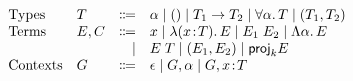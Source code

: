 \[
\begin{array}{llrl}
  \text{Types}    & T    & \Coloneqq & \alpha \mid () \mid {T_1} \to {T_2} \mid \forall \alpha.\, T \mid (T_1, T_2) \\
  \text{Terms}    & E, C & \Coloneqq & x \mid \lambda (x \!:\! T).\, E \mid E_1 \; E_2 \mid \Lambda \alpha.\, E \\
                  &      & \mid      & E \; T \mid (E_1, E_2) \mid {\textsf{proj}}_{k} E \\
  \text{Contexts} & G    & \Coloneqq & \epsilon \mid G, \alpha \mid G, x \!:\! T \\
\end{array}
\]
